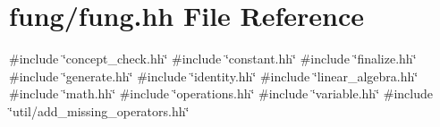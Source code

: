 \hypertarget{fung_8hh}{\section{fung/fung.hh \-File \-Reference}
\label{fung_8hh}
}
{\ttfamily \#include \char`\"{}concept\-\_\-check.\-hh\char`\"{}}\*
{\ttfamily \#include \char`\"{}constant.\-hh\char`\"{}}\*
{\ttfamily \#include \char`\"{}finalize.\-hh\char`\"{}}\*
{\ttfamily \#include \char`\"{}generate.\-hh\char`\"{}}\*
{\ttfamily \#include \char`\"{}identity.\-hh\char`\"{}}\*
{\ttfamily \#include \char`\"{}linear\-\_\-algebra.\-hh\char`\"{}}\*
{\ttfamily \#include \char`\"{}math.\-hh\char`\"{}}\*
{\ttfamily \#include \char`\"{}operations.\-hh\char`\"{}}\*
{\ttfamily \#include \char`\"{}variable.\-hh\char`\"{}}\*
{\ttfamily \#include \char`\"{}util/add\-\_\-missing\-\_\-operators.\-hh\char`\"{}}\*
